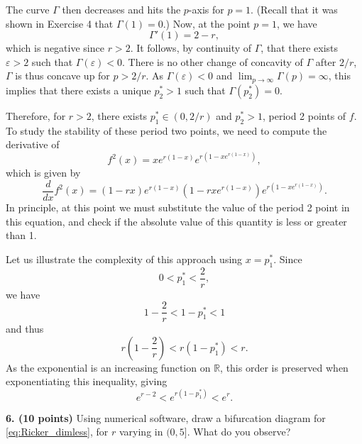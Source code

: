 \documentclass[12pt]{article}
\theoremstyle{plain}
\def\IR{\mathbb{R}}
\begin{document}
The curve $\Gamma$ then decreases and hits the $p$-axis for $p=1$. (Recall that
it was shown in Exercise 4 that $\Gamma(1)=0$.) Now, at the point $p=1$, we have
\[
\Gamma'(1)=2-r,
\]
which is negative since $r>2$. It follows, by continuity of $\Gamma$, that
there exists $\varepsilon>2$ such that $\Gamma(\varepsilon)<0$. There is no
other change of concavity of $\Gamma$ after $2/r$, $\Gamma$ is thus concave up
for $p>2/r$. As $\Gamma(\varepsilon)<0$ and
$\lim_{p\to\infty}\Gamma(p)=\infty$, this implies that there exists a unique
$p_2^*>1$ such that $\Gamma(p_2^*)=0$.

Therefore, for $r>2$, there exists $p_1^*\in(0,2/r)$ and $p_2^*>1$, period 2
points of $f$.
To study the stability of these period two points, we need to compute the
derivative of 
\[
f^2(x) = xe^{r(1-x)}e^{r(1-xe^{r(1-x)})},
\]
which is given by
\[
\frac{d}{dx}f^2(x) = (1-rx)e^{r(1-x)}
\left(
1-rxe^{r(1-x)}
\right)
e^{r\left(1-xe^{r(1-x)}\right)}.
\]
In principle, at this point we must substitute the value of the period 2 point in this equation, and check if the absolute value of this quantity is less or greater than 1. 

Let us illustrate the complexity of this approach using $x=p_1^*$. Since
\[
0<p_1^*<\frac 2r,
\]
we have
\[
1-\frac 2r<1-p_1^*<1
\]
and thus
\[
r\left(1-\frac 2r\right)<r(1-p_1^*)<r.
\]
As the exponential is an increasing function on $\IR$, this order is preserved when exponentiating this inequality, giving
\[
e^{r-2}<e^{r(1-p_1^*)}<e^r.
\]




\vskip0.4cm
\noindent
{\bf 6. (10 points)} 
Using numerical software, draw a bifurcation diagram for \eqref{eq:Ricker_dimless}, for $r$ varying in $(0,5]$. What do you observe?
\end{document}

